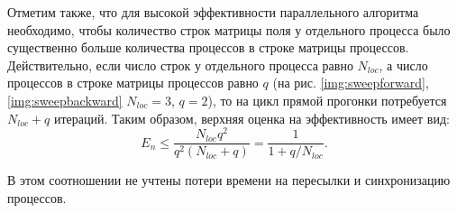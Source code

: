 Отметим также, что для высокой эффективности параллельного алгоритма необходимо, чтобы количество строк матрицы поля у отдельного процесса было существенно больше количества процессов в строке матрицы процессов.
Действительно, если число строк у отдельного процесса равно $N_{loc}$, а число процессов в строке матрицы процессов равно $q$ (на рис. \ref{img:sweepforward}, \ref{img:sweepbackward} $N_{loc}=3$, $q=2$), то на цикл прямой прогонки потребуется $N_{loc}+q$ итераций.
Таким образом, верхняя оценка на эффективность имеет вид:
\begin{equation}
    E_n\leqslant\frac{N_{loc}q^2}{q^2(N_{loc} + q)}=\frac{1}{1+q/N_{loc}}.
\end{equation}

В этом соотношении не учтены потери времени на пересылки и синхронизацию процессов. 